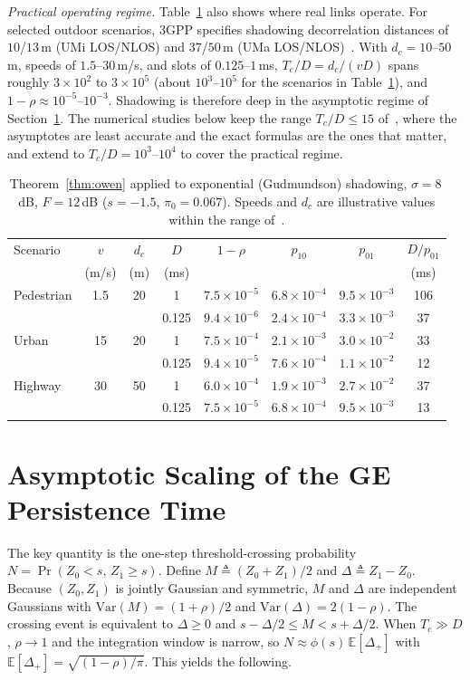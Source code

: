 \documentclass[conference]{IEEEtran}
\DeclareMathOperator{\Prob}{Pr}
\begin{document}
\emph{Practical operating regime.} Table~\ref{tab:examples} also shows where real links operate. For selected outdoor scenarios, 3GPP specifies shadowing decorrelation distances of $10$/$13$\,m (UMi LOS/NLOS) and $37$/$50$\,m (UMa LOS/NLOS)~\cite[Table~7.5-6]{3gpp38901}. With $d_c=10$--$50$\,m, speeds of $1.5$--$30$\,m/s, and slots of $0.125$--$1$\,ms, $T_c/D=d_c/(vD)$ spans roughly $3\times10^2$ to $3\times10^5$ (about $10^3$--$10^5$ for the scenarios in Table~\ref{tab:examples}), and $1-\rho\approx10^{-5}$--$10^{-3}$. Shadowing is therefore deep in the asymptotic regime of Section~\ref{sec:scaling}. The numerical studies below keep the range $T_c/D\le15$ of~\cite{krishnamachari2026}, where the asymptotes are least accurate and the exact formulas are the ones that matter, and extend to $T_c/D=10^3$--$10^4$ to cover the practical regime.

\begin{table}[t]
\centering
\caption{Theorem~\ref{thm:owen} applied to exponential (Gudmundson) shadowing, $\sigma=8$\,dB, $F=12$\,dB ($s=-1.5$, $\pi_0=0.067$). Speeds and $d_c$ are illustrative values within the range of~\cite[Table~7.5-6]{3gpp38901}.}\label{tab:examples}
\footnotesize
\setlength{\tabcolsep}{2.6pt}
\begin{tabular}{@{}lccccccc@{}}
\toprule
Scenario & $v$ & $d_c$ & $D$ & $1-\rho$ & $p_{10}$ & $p_{01}$ & $D/p_{01}$\\
 & (m/s) & (m) & (ms) & & & & (ms)\\
\midrule
Pedestrian & 1.5 & 20 & 1 & $7.5{\times}10^{-5}$ & $6.8{\times}10^{-4}$ & $9.5{\times}10^{-3}$ & 106\\
 & & & 0.125 & $9.4{\times}10^{-6}$ & $2.4{\times}10^{-4}$ & $3.3{\times}10^{-3}$ & 37\\
Urban & 15 & 20 & 1 & $7.5{\times}10^{-4}$ & $2.1{\times}10^{-3}$ & $3.0{\times}10^{-2}$ & 33\\
 & & & 0.125 & $9.4{\times}10^{-5}$ & $7.6{\times}10^{-4}$ & $1.1{\times}10^{-2}$ & 12\\
Highway & 30 & 50 & 1 & $6.0{\times}10^{-4}$ & $1.9{\times}10^{-3}$ & $2.7{\times}10^{-2}$ & 37\\
 & & & 0.125 & $7.5{\times}10^{-5}$ & $6.8{\times}10^{-4}$ & $9.5{\times}10^{-3}$ & 13\\
\bottomrule
\end{tabular}
\end{table}

\section{Asymptotic Scaling of the GE Persistence Time}\label{sec:scaling}
The key quantity is the one-step threshold-crossing probability $N=\Prob(Z_0<s,\,Z_1\ge s)$. Define $M\triangleq(Z_0+Z_1)/2$ and $\Delta\triangleq Z_1-Z_0$. Because $(Z_0,Z_1)$ is jointly Gaussian and symmetric, $M$ and $\Delta$ are independent Gaussians with $\mathrm{Var}(M)=(1+\rho)/2$ and $\mathrm{Var}(\Delta)=2(1-\rho)$. The crossing event is equivalent to $\Delta\ge0$ and $s-\Delta/2\le M<s+\Delta/2$. When $T_c\gg D$, $\rho\to1$ and the integration window is narrow, so $N\approx\phi(s)\,\mathbb{E}[\Delta_+]$ with $\mathbb{E}[\Delta_+]=\sqrt{(1-\rho)/\pi}$. This yields the following.
\end{document}
